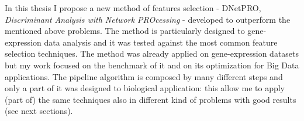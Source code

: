 \documentclass{standalone}
\begin{document}
In this thesis I propose a new method of features selection - DNetPRO, \emph{Discriminant Analysis with Network PROcessing} - developed to outperform the mentioned above problems.
The method is particularly designed to gene-expression data analysis and it was tested against the most common feature selection techniques.
The method was already applied on gene-expression datasets but my work focused on the benchmark of it and on its optimization for Big Data applications.
The pipeline algorithm is composed by many different steps and only a part of it was designed to biological application: this allow me to apply (part of) the same techniques also in different kind of problems with good results (see next sections).
\end{document}
